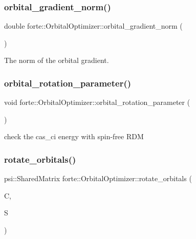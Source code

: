 \subsubsection{\texorpdfstring{orbital\+\_\+gradient\+\_\+norm()}{orbital\_gradient\_norm()}}
{\footnotesize\ttfamily double forte\+::\+Orbital\+Optimizer\+::orbital\+\_\+gradient\+\_\+norm (\begin{DoxyParamCaption}{ }\end{DoxyParamCaption})\hspace{0.3cm}{\ttfamily [inline]}}



The norm of the orbital gradient. 

\mbox{\label{classforte_1_1_orbital_optimizer_ab203be9923d38cc32fcc14dde9c7ee6e}} 
\subsubsection{\texorpdfstring{orbital\+\_\+rotation\+\_\+parameter()}{orbital\_rotation\_parameter()}}
{\footnotesize\ttfamily void forte\+::\+Orbital\+Optimizer\+::orbital\+\_\+rotation\+\_\+parameter (\begin{DoxyParamCaption}{ }\end{DoxyParamCaption})\hspace{0.3cm}{\ttfamily [protected]}}



check the cas\+\_\+ci energy with spin-\/free R\+DM 

\mbox{\label{classforte_1_1_orbital_optimizer_a98809e4d8fe5a75f5ec20773ae6d4274}} 
\subsubsection{\texorpdfstring{rotate\+\_\+orbitals()}{rotate\_orbitals()}}
{\footnotesize\ttfamily psi\+::\+Shared\+Matrix forte\+::\+Orbital\+Optimizer\+::rotate\+\_\+orbitals (\begin{DoxyParamCaption}\item[{psi\+::\+Shared\+Matrix}]{C,  }\item[{psi\+::\+Shared\+Matrix}]{S }\end{DoxyParamCaption})}

